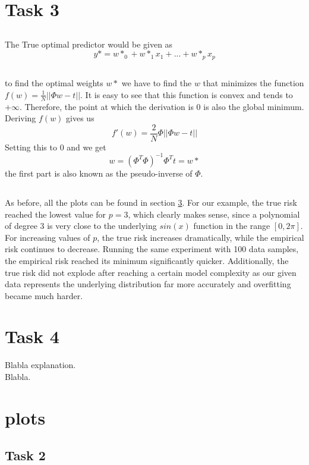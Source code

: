 \documentclass{article}
\begin{document}
\section{Task 3}
\subsection{}
The True optimal predictor would be given as $$y*=w*_0+w*_1x_1+...+w*_px_p$$

\subsection{}
to find the optimal weights $w*$ we have to find the $w$ that minimizes the function $f(w)=\frac{1}{N}||\Phi w-t||$. It is easy to see that this function is convex and tends to $+\infty$. Therefore, the point at which the derivation is 0 is also the global minimum. Deriving $f(w)$ gives us 
$$f'(w)=\frac{2}{N}\Phi ||\Phi w-t||$$
Setting this to 0 and we get 
$$w=(\Phi^T\Phi)^{-1}\Phi^Tt=w*$$
the first part is also known as the pseudo-inverse of $\Phi$.

\subsection{}
As before, all the plots can be found in section \ref{plots}.
For our example, the true risk reached the lowest value for $p=3$, which clearly makes sense, since a polynomial of degree 3 is very close to the underlying $sin(x)$ function in the range $[0, 2\pi]$. For increasing values of $p$, the true risk increases dramatically, while the empirical risk continues to decrease.
Running the same experiment with 100 data samples, the empirical risk reached its minimum significantly quicker. Additionally, the true risk did not explode after reaching a certain model complexity as our given data represents the underlying distribution far more accurately and overfitting became much harder.

\section{Task 4}
Blabla explanation.\\
Blabla.

\newpage
\section{plots}
\label{plots}
\subsection{Task 2}
\end{document}
